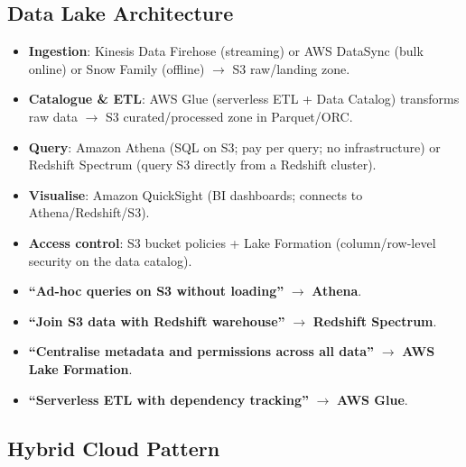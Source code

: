 \subsection{Data Lake Architecture}

\begin{keyfacts}
\begin{itemize}
  \item \textbf{Ingestion}: Kinesis Data Firehose (streaming) or AWS DataSync (bulk online)
        or Snow Family (offline) $\to$ S3 raw/landing zone.
  \item \textbf{Catalogue \& ETL}: AWS Glue (serverless ETL + Data Catalog) transforms raw
        data $\to$ S3 curated/processed zone in Parquet/ORC.
  \item \textbf{Query}: Amazon Athena (SQL on S3; pay per query; no infrastructure) or
        Redshift Spectrum (query S3 directly from a Redshift cluster).
  \item \textbf{Visualise}: Amazon QuickSight (BI dashboards; connects to Athena/Redshift/S3).
  \item \textbf{Access control}: S3 bucket policies + Lake Formation (column/row-level
        security on the data catalog).
\end{itemize}
\end{keyfacts}

\begin{examtip}[title={[!] Data lake query pattern shortcuts}]
\begin{itemize}
  \item \textbf{``Ad-hoc queries on S3 without loading''} $\to$ \textbf{Athena}.
  \item \textbf{``Join S3 data with Redshift warehouse''} $\to$ \textbf{Redshift Spectrum}.
  \item \textbf{``Centralise metadata and permissions across all data''} $\to$
        \textbf{AWS Lake Formation}.
  \item \textbf{``Serverless ETL with dependency tracking''} $\to$ \textbf{AWS Glue}.
\end{itemize}
\end{examtip}

\subsection{Hybrid Cloud Pattern}

